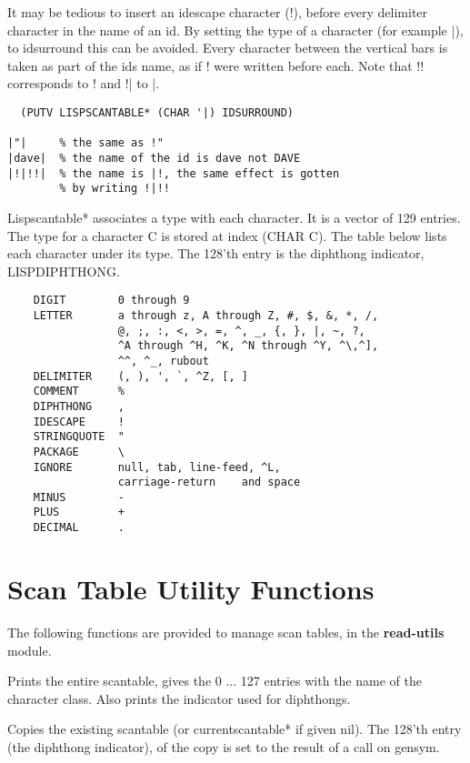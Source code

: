 \vspace{0.5cm}
It  may  be  tedious to insert an idescape character (!), before
every delimiter character in the name of an id.  By setting  the
type  of  a character (for example |), to idsurround this can be
avoided.  Every character between the vertical bars is taken  as
part  of  the  ids name, as if ! were written before each.  Note
that !! corresponds to ! and !| to |.
\begin{verbatim}
  (PUTV LISPSCANTABLE* (CHAR '|) IDSURROUND)

|"|     % the same as !"
|dave|  % the name of the id is dave not DAVE
|!|!!|  % the name is |!, the same effect is gotten
        % by writing !|!!
\end{verbatim}
{
    Lispscantable* associates a type with each character.  It is
    a vector of 129 entries.  The type  for  a  character  C  is
    stored  at  index  (CHAR  C).    The  table below lists each
    character under its type.  The 128'th entry is the diphthong
    indicator, LISPDIPHTHONG.
}

\begin{verbatim}
    DIGIT        0 through 9
    LETTER       a through z, A through Z, #, $, &, *, /,
                 @, ;, :, <, >, =, ^, _, {, }, |, ~, ?,
                 ^A through ^H, ^K, ^N through ^Y, ^\,^],
                 ^^, ^_, rubout
    DELIMITER    (, ), ', `, ^Z, [, ]
    COMMENT      %
    DIPHTHONG    ,
    IDESCAPE     !
    STRINGQUOTE  "
    PACKAGE      \
    IGNORE       null, tab, line-feed, ^L,
                 carriage-return	and space
    MINUS        -
    PLUS         +
    DECIMAL      .
\end{verbatim}

\section{Scan Table Utility Functions}

The following functions are provided to manage scan tables, in
the {\bf read-utils} module.

{    Prints the entire scantable,  gives  the  0 ... 127  entries
    with  the  name  of  the  character  class.  Also prints the
    indicator used for diphthongs.
}

{    Copies the existing scantable (or currentscantable* if given
    nil).  The 128'th entry (the diphthong  indicator),  of  the
    copy is set to the result of a call on gensym.
}

